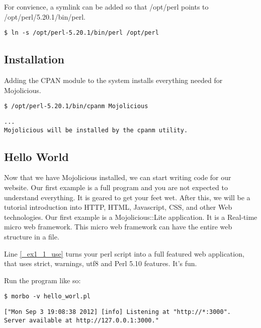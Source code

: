 \documentclass[14pt]{extreport}
\newcommand\Small{\fontsize{10}{10.2}\selectfont}
\newcommand*\LSTfont{\Small\ttfamily\SetTracking{encoding=*}{-60}\lsstyle}
\begin{document}
For convience, a symlink can be added so that /opt/perl points to
/opt/perl/5.20.1/bin/perl.

\begin{lstlisting}[style=BashInputStyle]
$ ln -s /opt/perl-5.20.1/bin/perl /opt/perl
\end{lstlisting}

\subsection{Installation}

Adding the CPAN module to the system installs everything needed for
Mojolicious. 

\begin{lstlisting}[style=BashInputStyle]
$ /opt/perl-5.20.1/bin/cpanm Mojolicious
\end{lstlisting}

\begin{lstlisting}[style=BashOutputStyle]
...
Mojolicious will be installed by the cpanm utility.
\end{lstlisting}

\subsection{Hello World}

Now that we have Mojolicious installed, we can start writing code for our
website. Our first example is a full program and you are not expected to
understand everything. It is geared to get your feet wet. After this, we will
be a tutorial introduction into HTTP, HTML, Javascript, CSS, and other Web
technologies.  Our first example is a Mojolicious::Lite application. It is a
Real-time micro web framework. This micro web framework can have the entire web
structure in a file.



Line \ref{_ex1_1_use} turns your perl script into a full featured web
application, that uses strict, warnings, utf8 and Perl 5.10 features. It's fun.

Run the program like so:

\begin{lstlisting}[style=BashInputStyle]
$ morbo -v hello_worl.pl
\end{lstlisting}

\begin{lstlisting}[style=BashOutputStyle]
["Mon Sep 3 19:08:38 2012] [info] Listening at "http://*:3000".
Server available at http://127.0.0.1:3000."
\end{lstlisting}
\end{document}
